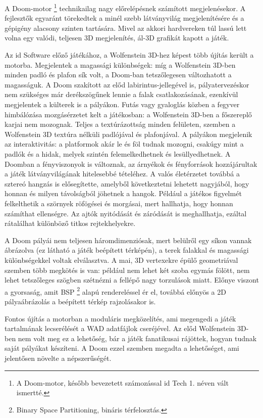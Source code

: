 \documentclass{thesis-ekf}
\theoremstyle{definition}
\theoremstyle{remark}
\begin{document}
A Doom-motor \footnote{A Doom-motor, később bevezetett számozással id Tech 1.
néven vált ismertté.} technikailag nagy előrelépésnek számított megjelenésekor.
A fejlesztők egyaránt törekedtek a minél szebb látványvilág megjelenítésére és a
gépigény alacsony szinten tartására. Mivel az akkori hardvereken túl lassú lett
volna egy valódi, teljesen 3D megjelenítés, ál-3D grafikát kapott a játék.

Az id Software előző játékához, a Wolfenstein 3D-hez képest több újítás került a
motorba. Megjelentek a magassági különbségek: míg a Wolfenstein 3D-ben minden
padló és plafon sík volt, a Doom-ban tetszőlegesen változhatott a magasságuk. A
Doom szakított az előd labirintus-jellegével is, pályatervezéskor nem szükséges
már derékszögűnek lennie a falak csatlakozásának, ezenkívül megjelentek a
külterek is a pályákon. Futás vagy gyaloglás közben a fegyver himbálózása
mozgásérzetet kelt a játékosban: a Wolfenstein 3D-ben a főszereplő karjai nem
mozognak. Teljes a textúrázottság minden felületen, szemben a Wolfenstein 3D
textúra nélküli padlójával és plafonjával. A pályákon megjelenik az
interaktivitás: a platformok akár le és föl tudnak mozogni, csakúgy mint a
padlók és a hidak, melyek szintén felemelkedhetnek és lesüllyedhetnek. A Doomban
a fényviszonyok is változnak, az árnyékok és fényforrások hozzájárultak a játék
látványvilágának hitelesebbé tételéhez. A valós életérzetet továbbá a sztereó
hangzás is elősegítette, amelyből következtetni lehetett nagyjából, hogy honnan
és milyen távolságból jöhetnek a hangok. Például a játékos figyelmét
felkelthetik a szörnyek röfögései és morgásai, mert hallhatja, hogy honnan
számíthat ellenségre. Az ajtók nyitódását és záródását is meghallhatja, ezáltal
rátalálhat különböző titkos rejtekhelyekre.

A Doom pályái nem teljesen háromdimenziósak, mert belülről egy síkon vannak
ábrázolva (ez látható a játék beépített térképén), a terek falakkal és
magassági különbségekkel voltak elválasztva. A mai, 3D vertexekre épülő
geometriával szemben több megkötés is van: például nem lehet két szoba egymás
fölött, nem lehet tetszőleges szögben szétnézni a fellépő nagy torzulások miatt.
Előnye viszont a gyorsaság, amit BSP \footnote{Binary Space Partitioning,
bináris térfelosztás.} alapú rendereléssel ér el, továbbá előnyös a 2D
pályaábrázolás a beépített térkép rajzolásakor is.

Fontos újítás a motorban a moduláris megközelítés, ami megengedi a játék
tartalmának lecserélését a WAD adatfájlok cseréjével. Az előd Wolfenstein 3D-ben
nem volt meg ez a lehetőség, bár a játék fanatikusai rájöttek, hogyan tudnak
saját pályákat készíteni. A Doom ezzel szemben megadta a lehetőséget, ami
jelentősen növelte a népszerűségét.
\end{document}
